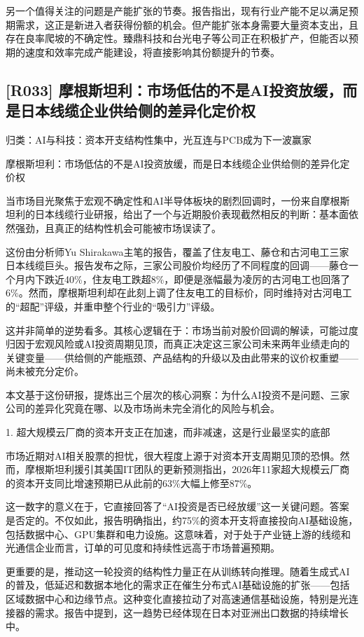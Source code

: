 \documentclass[11pt]{ctexart}
\begin{document}
另一个值得关注的问题是产能扩张的节奏。报告指出，现有行业产能不足以满足预期需求，这正是新进入者获得份额的机会。但产能扩张本身需要大量资本支出，且存在良率爬坡的不确定性。臻鼎科技和台光电子等公司正在积极扩产，但能否以预期的速度和效率完成产能建设，将直接影响其份额提升的节奏。

\subsection{[R033] 摩根斯坦利：市场低估的不是AI投资放缓，而是日本线缆企业供给侧的差异化定价权}
{\small\color{refgray}归类：AI与科技：资本开支结构性集中，光互连与PCB成为下一波赢家}

摩根斯坦利：市场低估的不是AI投资放缓，而是日本线缆企业供给侧的差异化定价权

当市场目光聚焦于宏观不确定性和AI半导体板块的剧烈回调时，一份来自摩根斯坦利的日本线缆行业研报，给出了一个与近期股价表现截然相反的判断：基本面依然强劲，且真正的结构性机会可能被市场误读了。

这份由分析师Yu Shirakawa主笔的报告，覆盖了住友电工、藤仓和古河电工三家日本线缆巨头。报告发布之际，三家公司股价均经历了不同程度的回调——藤仓一个月内下跌近40\%，住友电工跌超8\%，即便是涨幅最为凌厉的古河电工也回落了6\%。然而，摩根斯坦利却在此刻上调了住友电工的目标价，同时维持对古河电工的“超配”评级，并重申整个行业的“吸引力”评级。

这并非简单的逆势看多。其核心逻辑在于：市场当前对股价回调的解读，可能过度归因于宏观风险或AI投资周期见顶，而真正决定这三家公司未来两年业绩走向的关键变量——供给侧的产能瓶颈、产品结构的升级以及由此带来的议价权重塑——尚未被充分定价。

本文基于这份研报，提炼出三个层次的核心洞察：为什么AI投资不是问题、三家公司的差异化究竟在哪、以及市场尚未完全消化的风险与机会。

1. 超大规模云厂商的资本开支正在加速，而非减速，这是行业最坚实的底部

市场近期对AI相关股票的担忧，很大程度上源于对资本开支周期见顶的恐惧。然而，摩根斯坦利援引其美国IT团队的更新预测指出，2026年11家超大规模云厂商的资本开支同比增速预期已从此前的63\%大幅上修至87\%。

这一数字的意义在于，它直接回答了“AI投资是否已经放缓”这一关键问题。答案是否定的。不仅如此，报告明确指出，约75\%的资本开支将直接投向AI基础设施，包括数据中心、GPU集群和电力设施。这意味着，对于处于产业链上游的线缆和光通信企业而言，订单的可见度和持续性远高于市场普遍预期。

更重要的是，推动这一轮投资的结构性力量正在从训练转向推理。随着生成式AI的普及，低延迟和数据本地化的需求正在催生分布式AI基础设施的扩张——包括区域数据中心和边缘节点。这种变化直接拉动了对高速通信基础设施，特别是光连接器的需求。报告中提到，这一趋势已经体现在日本对亚洲出口数据的持续增长中。
\end{document}
